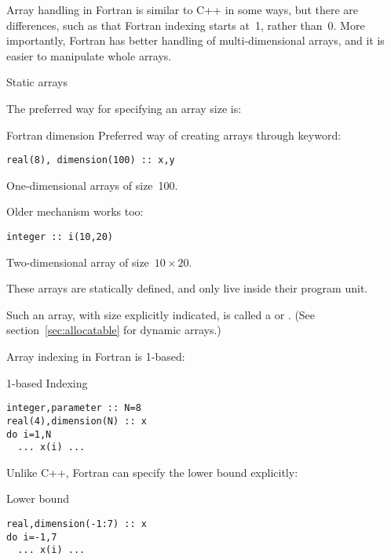 
Array handling in Fortran is similar to C++ in some ways, but there
are differences, such as that  Fortran indexing starts at~1, rather
than~0. More importantly, Fortran has better handling of
multi-dimensional arrays, and it is easier to manipulate whole arrays.

 {Static arrays}

The preferred way for specifying an array size is:

\begin{block}{Fortran dimension}
  \label{sl:farray-dimension}
Preferred way of creating arrays through 
keyword:
\begin{lstlisting}
real(8), dimension(100) :: x,y
\end{lstlisting}
One-dimensional arrays of size~100.

Older mechanism works too:
\begin{lstlisting}
integer :: i(10,20)
\end{lstlisting}
Two-dimensional array of size~$10\times 20$.

These arrays are statically defined, and only live inside their
program unit.
\end{block}

Such an array, with size explicitly indicated, is called a
 or .
(See section~\ref{sec:allocatable} for
dynamic arrays.)

Array indexing in Fortran is 1-based:
\begin{block}{1-based Indexing}
  \label{sl:farray-base1}
\begin{lstlisting}
integer,parameter :: N=8
real(4),dimension(N) :: x
do i=1,N
  ... x(i) ...
\end{lstlisting}
\end{block}

Unlike C++, Fortran can specify the lower bound explicitly:
\begin{block}{Lower bound}
  \label{sl:farray-lower}
\begin{lstlisting}
real,dimension(-1:7) :: x
do i=-1,7
  ... x(i) ...
\end{lstlisting}
\end{block}

